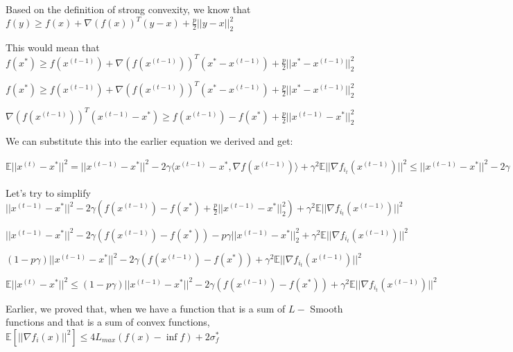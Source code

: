 Based on the definition of strong convexity, we know that $f(y) \geq f(x) + \nabla(f(x))^T (y - x) + \frac{p}{2} ||y - x||^2_2$ \newline 


This would mean that $f(x^*) \geq f(x^{(t - 1)}) + \nabla(f(x^{(t - 1)}))^T (x^* - x^{(t - 1)}) + \frac{p}{2} ||x^* - x^{(t - 1)}||^2_2$ \newline 


$f(x^*) \geq f(x^{(t - 1)}) + \nabla(f(x^{(t - 1)}))^T (x^* - x^{(t - 1)}) + \frac{p}{2} ||x^* - x^{(t - 1)}||^2_2$ \newline 


$\nabla(f(x^{(t - 1)}))^T (x^{(t - 1)} - x^*) \geq f(x^{(t - 1)}) - f(x^*) + \frac{p}{2} ||x^{(t - 1)} - x^*||^2_2$ \newline 

We can substitute this into the earlier equation we derived and get: \newline 

$\mathbb{E}||x^{(t)} - x^*||^2 = ||x^{(t - 1)} - x^*||^2 - 2\gamma \langle x^{(t - 1)} - x^*,  \nabla f(x^{(t - 1)})\rangle + \gamma^2 \mathbb{E} ||\nabla f_{i_t}(x^{(t - 1)})||^2 \leq ||x^{(t - 1)} - x^*||^2 - 2\gamma (f(x^{(t - 1)}) - f(x^*) + \frac{p}{2} ||x^{(t - 1)} - x^*||^2_2) + \gamma^2 \mathbb{E} ||\nabla f_{i_t}(x^{(t - 1)})||^2$ \newline 

Let's try to simplify $||x^{(t - 1)} - x^*||^2 - 2\gamma (f(x^{(t - 1)}) - f(x^*) + \frac{p}{2} ||x^{(t - 1)} - x^*||^2_2) + \gamma^2 \mathbb{E} ||\nabla f_{i_t}(x^{(t - 1)})||^2$ \newline 

$||x^{(t - 1)} - x^*||^2 - 2\gamma (f(x^{(t - 1)}) - f(x^*)) - p \gamma ||x^{(t - 1)} - x^*||^2_2 + \gamma^2 \mathbb{E} ||\nabla f_{i_t}(x^{(t - 1)})||^2$ \newline 


$(1 - p \gamma)||x^{(t - 1)} - x^*||^2 - 2\gamma (f(x^{(t - 1)}) - f(x^*))+ \gamma^2 \mathbb{E} ||\nabla f_{i_t}(x^{(t - 1)})||^2$ \newline 

$\mathbb{E}||x^{(t)} - x^*||^2  \leq (1 - p \gamma)||x^{(t - 1)} - x^*||^2 - 2\gamma (f(x^{(t - 1)}) - f(x^*))+ \gamma^2 \mathbb{E} ||\nabla f_{i_t}(x^{(t - 1)})||^2$ \newline 

Earlier, we proved that, when we have a function that is a sum of $L-$ Smooth functions and that is a sum of convex functions, $\mathbb{E}[||\nabla f_i(x)||^2] \leq 4L_{max} (f(x) - \inf f) + 2 \sigma_f^*$ \newline 

